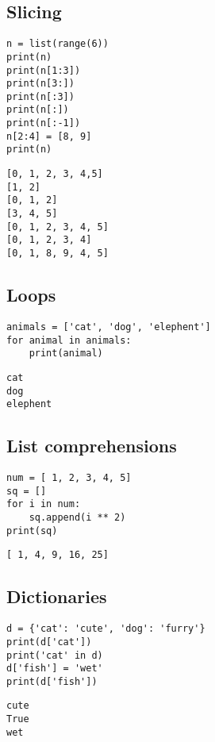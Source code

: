 \subsection{Slicing}
\vspace{-.6cm}
\begin{code}
\begin{lstlisting}
n = list(range(6))
print(n)
print(n[1:3])
print(n[3:])
print(n[:3])
print(n[:])
print(n[:-1])
n[2:4] = [8, 9]
print(n)
\end{lstlisting}
\end{code}
\vspace{-.75cm} 
\begin{verbatim}
[0, 1, 2, 3, 4,5]
[1, 2]
[0, 1, 2]
[3, 4, 5]
[0, 1, 2, 3, 4, 5]
[0, 1, 2, 3, 4]
[0, 1, 8, 9, 4, 5]
\end{verbatim}
\vspace{-.6cm}
\subsection{Loops}
\vspace{-.6cm}
\begin{code}
\begin{lstlisting}
animals = ['cat', 'dog', 'elephent']
for animal in animals:
    print(animal)
\end{lstlisting}
\end{code}
\vspace{-1cm}
\begin{verbatim}
cat
dog
elephent
\end{verbatim}
\vspace{-.6cm}
\subsection{List comprehensions}
\vspace{-.8cm}
\begin{code}
\begin{lstlisting}
num = [ 1, 2, 3, 4, 5]
sq = []
for i in num:
    sq.append(i ** 2)
print(sq)
\end{lstlisting}
\end{code}
\vspace{-1cm}
\begin{verbatim}
[ 1, 4, 9, 16, 25]
\end{verbatim}
\vspace{-.6cm}
\subsection{Dictionaries}
\vspace{-.6cm}
\begin{code}[H]
\begin{lstlisting}
d = {'cat': 'cute', 'dog': 'furry'}
print(d['cat'])
print('cat' in d)
d['fish'] = 'wet'
print(d['fish']) 
\end{lstlisting}
\end{code}
\vspace{-1.7cm}
\begin{verbatim}
cute
True
wet
\end{verbatim}
\newpage
\vspace{-.75cm}

